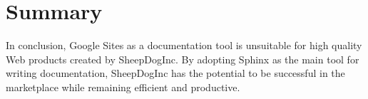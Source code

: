 \documentclass[letterpaper]{report}
\begin{document}
\section*{Summary}

    In conclusion, Google Sites as a documentation tool is unsuitable for high
    quality Web products created by SheepDogInc. By adopting Sphinx as the main
    tool for writing documentation, SheepDogInc has the potential to be
    successful in the marketplace while remaining efficient and productive.
\end{document}
